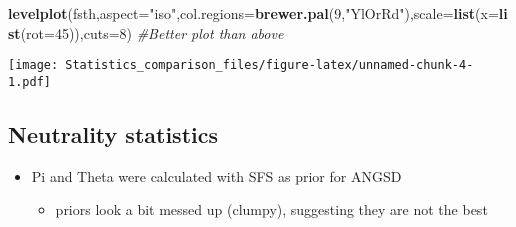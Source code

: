 \documentclass[]{article}
\newenvironment{Shaded}{\begin{snugshade}}{\end{snugshade}}
\newcommand{\KeywordTok}[1]{\textcolor[rgb]{0.13,0.29,0.53}{\textbf{#1}}}
\newcommand{\DataTypeTok}[1]{\textcolor[rgb]{0.13,0.29,0.53}{#1}}
\newcommand{\DecValTok}[1]{\textcolor[rgb]{0.00,0.00,0.81}{#1}}
\newcommand{\StringTok}[1]{\textcolor[rgb]{0.31,0.60,0.02}{#1}}
\newcommand{\CommentTok}[1]{\textcolor[rgb]{0.56,0.35,0.01}{\textit{#1}}}
\newcommand{\NormalTok}[1]{#1}
\providecommand{\tightlist}{%
  \setlength{\itemsep}{0pt}\setlength{\parskip}{0pt}}
\begin{document}
\begin{Shaded}
\begin{Highlighting}[]
\KeywordTok{levelplot}\NormalTok{(fsth,}\DataTypeTok{aspect=}\StringTok{"iso"}\NormalTok{,}\DataTypeTok{col.regions=}\KeywordTok{brewer.pal}\NormalTok{(}\DecValTok{9}\NormalTok{,}\StringTok{"YlOrRd"}\NormalTok{),}\DataTypeTok{scale=}\KeywordTok{list}\NormalTok{(}\DataTypeTok{x=}\KeywordTok{list}\NormalTok{(}\DataTypeTok{rot=}\DecValTok{45}\NormalTok{)),}\DataTypeTok{cuts=}\DecValTok{8}\NormalTok{) }\CommentTok{#Better plot than above}
\end{Highlighting}
\end{Shaded}

\texttt{[image: Statistics\_comparison\_files/figure-latex/unnamed-chunk-4-1.pdf]}

\subsection{Neutrality statistics}\label{neutrality-statistics}

\begin{itemize}
\tightlist
\item
  Pi and Theta were calculated with SFS as prior for ANGSD

  \begin{itemize}
  \tightlist
  \item
    priors look a bit messed up (clumpy), suggesting they are not the
    best
  \end{itemize}
\end{itemize}
\end{document}
